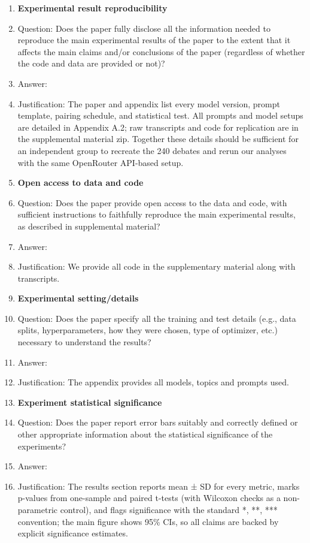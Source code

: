 \documentclass{article}
\begin{document}
\begin{enumerate}
    \item {\bf Experimental result reproducibility}
    \item[] Question: Does the paper fully disclose all the information needed to reproduce the main experimental results of the paper to the extent that it affects the main claims and/or conclusions of the paper (regardless of whether the code and data are provided or not)?
    \item[] Answer: \answerYes{} %
    \item[] Justification: The paper and appendix list every model version, prompt template, pairing schedule, and statistical test. All prompts and model setups are detailed in Appendix A.2; raw transcripts and code for replication are in the supplemental material zip. Together these details should be sufficient for an independent group to recreate the 240 debates and rerun our analyses with the same OpenRouter API-based setup.

\item {\bf Open access to data and code}
    \item[] Question: Does the paper provide open access to the data and code, with sufficient instructions to faithfully reproduce the main experimental results, as described in supplemental material?
    \item[] Answer: \answerYes{} %
    \item[] Justification: We provide all code in the supplementary material along with transcripts.

\item {\bf Experimental setting/details}
    \item[] Question: Does the paper specify all the training and test details (e.g., data splits, hyperparameters, how they were chosen, type of optimizer, etc.) necessary to understand the results?
    \item[] Answer: \answerYes{} %
    \item[] Justification: The appendix provides all models, topics and prompts used.

\item {\bf Experiment statistical significance}
    \item[] Question: Does the paper report error bars suitably and correctly defined or other appropriate information about the statistical significance of the experiments?
    \item[] Answer:\answerYes{} %
    \item[] Justification: The results section reports mean ± SD for every metric, marks p-values from one-sample and paired t-tests (with Wilcoxon checks as a non-parametric control), and flags significance with the standard *, **, *** convention; the main figure shows 95\% CIs, so all claims are backed by explicit significance estimates.{}


\end{enumerate}
\end{document}
